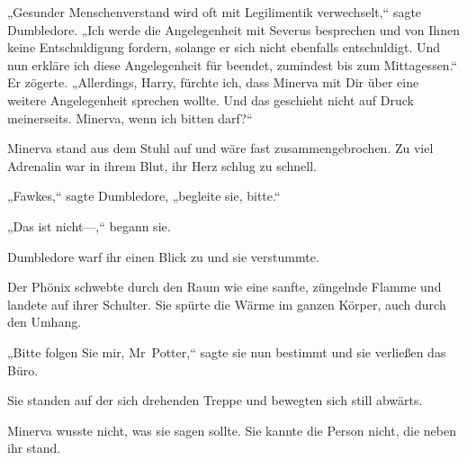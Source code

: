 „Gesunder Menschenverstand wird oft mit Legilimentik verwechselt,“ sagte Dumbledore. „Ich werde die Angelegenheit mit Severus besprechen und von Ihnen keine Entschuldigung fordern, solange er sich nicht ebenfalls entschuldigt. Und nun erkläre ich diese Angelegenheit für beendet, zumindest bis zum Mittagessen.“ Er zögerte. „Allerdings, Harry, fürchte ich, dass Minerva mit Dir über eine weitere Angelegenheit sprechen wollte. Und das geschieht nicht auf Druck meinerseits. Minerva, wenn ich bitten darf?“

Minerva stand aus dem Stuhl auf und wäre fast zusammengebrochen. Zu viel Adrenalin war in ihrem Blut, ihr Herz schlug zu schnell.

„Fawkes,“ sagte Dumbledore, „begleite sie, bitte.“

„Das ist nicht—,“ begann sie.

Dumbledore warf ihr einen Blick zu und sie verstummte.

Der Phönix schwebte durch den Raum wie eine sanfte, züngelnde Flamme und landete auf ihrer Schulter. Sie spürte die Wärme im ganzen Körper, auch durch den Umhang.

„Bitte folgen Sie mir, Mr~Potter,“ sagte sie nun bestimmt und sie verließen das Büro.

\later

Sie standen auf der sich drehenden Treppe und bewegten sich still abwärts.

Minerva wusste nicht, was sie sagen sollte. Sie kannte die Person nicht, die neben ihr stand.

